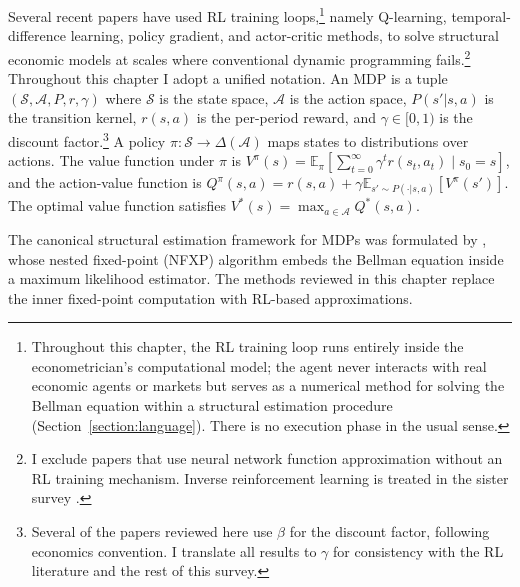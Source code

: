 Several recent papers have used RL training loops,\footnote{Throughout this chapter, the RL training loop runs entirely inside the econometrician's computational model; the agent never interacts with real economic agents or markets but serves as a numerical method for solving the Bellman equation within a structural estimation procedure (Section~\ref{section:language}). There is no execution phase in the usual sense.} namely Q-learning, temporal-difference learning, policy gradient, and actor-critic methods, to solve structural economic models at scales where conventional dynamic programming fails.\footnote{I exclude papers that use neural network function approximation without an RL training mechanism. Inverse reinforcement learning is treated in the sister survey \citep{RustRawat2026}.} Throughout this chapter I adopt a unified notation. An MDP is a tuple $(\mathcal{S}, \mathcal{A}, P, r, \gamma)$ where $\mathcal{S}$ is the state space, $\mathcal{A}$ is the action space, $P(s' | s, a)$ is the transition kernel, $r(s,a)$ is the per-period reward, and $\gamma \in [0,1)$ is the discount factor.\footnote{Several of the papers reviewed here use $\beta$ for the discount factor, following economics convention. I translate all results to $\gamma$ for consistency with the RL literature and the rest of this survey.} A policy $\pi: \mathcal{S} \to \Delta(\mathcal{A})$ maps states to distributions over actions. The value function under $\pi$ is $V^\pi(s) = \mathbb{E}_\pi\left[\sum_{t=0}^\infty \gamma^t r(s_t, a_t) \mid s_0 = s\right]$, and the action-value function is $Q^\pi(s,a) = r(s,a) + \gamma \mathbb{E}_{s' \sim P(\cdot|s,a)}[V^\pi(s')]$. The optimal value function satisfies $V^*(s) = \max_{a \in \mathcal{A}} Q^*(s,a)$.

The canonical structural estimation framework for MDPs was formulated by \citet{rust1994structural}, whose nested fixed-point (NFXP) algorithm embeds the Bellman equation inside a maximum likelihood estimator. The methods reviewed in this chapter replace the inner fixed-point computation with RL-based approximations.


